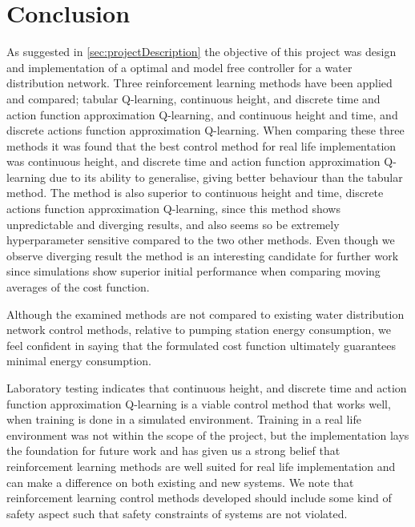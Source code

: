 \chapter{Conclusion}\label{chap:Conclusion}
As suggested in \cref{sec:projectDescription} the objective of this project was design and implementation of a optimal and model free  controller for a water distribution network. Three reinforcement learning methods have been applied and compared; tabular Q-learning, continuous height, and discrete time and action function approximation Q-learning, and continuous height and time, and discrete actions function approximation Q-learning. When comparing these three methods it was found that the best control method for real life implementation was continuous height, and discrete time and action function approximation Q-learning due to its ability to generalise, giving better behaviour than the tabular method. The method is also superior to continuous height and time, discrete actions function approximation Q-learning, since this method shows unpredictable and diverging results, and also seems so be extremely hyperparameter sensitive compared to the two other methods. Even though we observe diverging result the method is an interesting candidate for further work since simulations show superior initial performance when comparing moving averages of the cost function. 

Although the examined methods are not compared to existing water distribution network control methods, relative to pumping station energy consumption, we feel confident in saying that the formulated cost function ultimately guarantees minimal energy consumption.

Laboratory testing indicates that continuous height, and discrete time and action function approximation Q-learning is a viable control method that works well, when training is done in a simulated environment. Training in a real life environment was not within the scope of the project, but the implementation lays the foundation for future work and has given us a strong belief that reinforcement learning methods are well suited for real life implementation and can make a difference on both existing and new systems. We note that reinforcement learning control methods developed should include some kind of safety aspect such that safety constraints of systems are not violated. 
